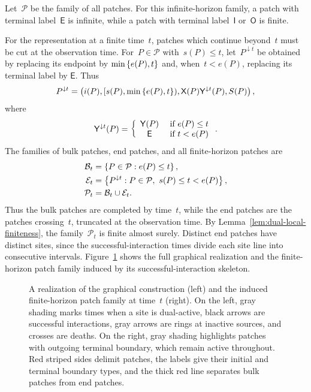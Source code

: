 \documentclass[EJP,preprint,NODS,nobera]{ejpecp}
\begin{document}
Let~$\mathcal P$ be the family of all patches. For this infinite-horizon family,
a patch with terminal label~$\mathsf E$ is infinite, while a patch with terminal
label~$\mathsf I$ or~$\mathsf O$ is finite.

For the representation at a finite time~$t$, patches which continue beyond~$t$
must be cut at the observation time. For~$P\in\mathcal P$ with~$s(P)\leq t$,
let~$P^{\downarrow t}$ be obtained by replacing its endpoint by
$\min\left\{e(P),t\right\}$ and, when~$t<e(P)$, replacing its terminal label by
$\mathsf E$. Thus
\begin{equation*}
P^{\downarrow t}
=
\left(
 i(P),
 [s(P),\min\left\{e(P),t\right\}),
 \mathsf X(P)\mathsf Y^{\downarrow t}(P),
 S(P)
\right),
\end{equation*}
where
\begin{equation*}
\mathsf Y^{\downarrow t}(P)
=
\left\{\begin{array}{cl} \mathsf Y(P) &\text{ if } e(P)\leq t \\ \mathsf E &\text{ if } t<e(P) \end{array}\right..
\end{equation*}
The families of bulk patches, end patches, and all finite-horizon patches are
\begin{align*}
\mathcal B_t
&=
\left\{P\in\mathcal P:e(P)\leq t\right\},
\\
\mathcal E_t
&=
\left\{P^{\downarrow t}:P\in\mathcal P,\ s(P)\leq t<e(P)\right\},
\\
\mathcal P_t
&=
\mathcal B_t\cup\mathcal E_t.
\end{align*}
Thus the bulk patches are completed by time~$t$, while the end patches are the
patches crossing~$t$, truncated at the observation time. By Lemma~\ref{lem:dual-local-finiteness}, the family~$\mathcal P_t$ is finite
almost surely. Distinct end patches have distinct sites, since the successful-interaction
times divide each site line into consecutive intervals. Figure~\ref{fig:patch-geometry} shows the full graphical realization and the
finite-horizon patch family induced by its successful-interaction skeleton.
\begin{figure}[htbp]
\centering
\resizebox{\linewidth}{!}{}
\caption{A realization of the graphical construction (left) and the induced
finite-horizon patch family at time~$t$ (right). On the left, gray shading marks
times when a site is dual-active, black arrows are successful interactions,
gray arrows are rings at inactive sources, and crosses are deaths. On the right,
gray shading highlights patches with outgoing terminal boundary, which remain
active throughout. Red striped sides delimit patches, the labels give their
initial and terminal boundary types, and the thick red line separates bulk
patches from end patches.}
\label{fig:patch-geometry}
\end{figure}
\FloatBarrier
\end{document}
